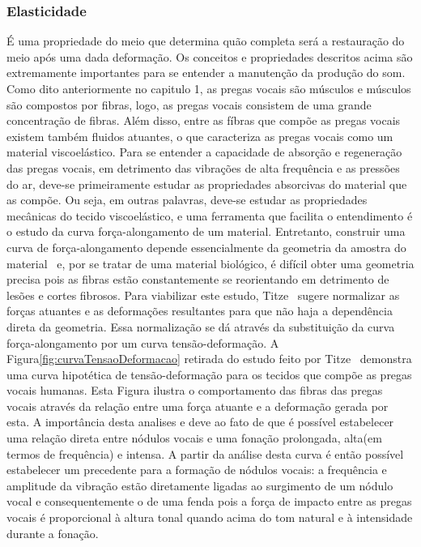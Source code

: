 	\subsubsection{Elasticidade}
	É uma propriedade do meio que determina quão completa será a restauração do meio após uma dada deformação.
	Os conceitos e propriedades descritos acima são extremamente importantes para se entender a manutenção da produção do som. Como dito anteriormente no capitulo 1, as pregas vocais são músculos e músculos são compostos por ﬁbras, logo, as pregas vocais consistem de uma grande concentração de ﬁbras. Além disso, entre as fíbras que compõe as pregas vocais existem também ﬂuidos atuantes, o que caracteriza as pregas vocais como um material viscoelástico. Para se entender a capacidade de absorção e regeneração das pregas vocais, em detrimento das vibrações de alta frequência e as pressões do ar, deve-se primeiramente estudar as propriedades absorcivas do material que as compõe. Ou seja, em outras palavras, deve-se estudar as propriedades mecânicas do tecido viscoelástico, e
	uma ferramenta que facilita o entendimento é o estudo da curva força-alongamento de um material.
	Entretanto, construir uma curva de força-alongamento depende essencialmente da geometria da amostra do material~\cite{IngoTitze} e, por se tratar de uma material biológico, é difícil obter uma geometria precisa pois as ﬁbras estão constantemente se reorientando em detrimento de lesões e cortes ﬁbrosos. Para viabilizar este estudo, Titze~\cite{IngoTitze} sugere normalizar as forças atuantes e as deformações resultantes para que não haja a dependência direta da geometria. Essa normalização se dá através da substituição da curva força-alongamento por um curva tensão-deformação.
	A Figura\ref{fig:curvaTensaoDeformacao} retirada do estudo feito por Titze~\cite{IngoTitze} demonstra uma curva hipotética de tensão-deformação para os tecidos que compõe as pregas vocais humanas. Esta Figura ilustra o comportamento das ﬁbras das pregas vocais através da relação entre uma força atuante e a deformação gerada por esta. A importância desta analises e deve ao fato de que é possível estabelecer uma relação direta entre nódulos vocais e uma fonação prolongada, alta(em termos de frequência) e intensa.
	A partir da análise desta curva é então possível estabelecer um precedente para a formação de nódulos vocais: a frequência e amplitude da vibração estão diretamente ligadas ao surgimento de um nódulo vocal e consequentemente o de uma fenda pois a força de impacto entre as pregas vocais é proporcional à altura tonal quando acima do tom natural e à intensidade durante a fonação.

